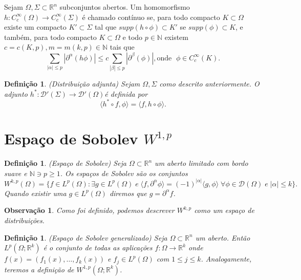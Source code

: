 \documentclass[12pt]{book}
\newtheorem{definicao}[teorema]{Definição}
\newtheorem{observacao}[teorema]{Observação}
\newcommand{\distribuicoesgeral}[1]{\mathcal{D'}(#1)}
\newcommand{\espacoLp}[1]{L^{p}(#1)}
\newcommand{\espacoLpcontradominio}[2]{L^{p}(#1;#2)}
\newcommand{\espacoLpGeral}[2]{L^{#1}(#2)}
\newcommand{\espacosobolevcontradominio}[2]{W^{1,p}(#1;#2)}
\newcommand{\funcoesdiferenciaveissupp}[2]{C^{#1}_{c}(#2)}
\newcommand{\funcoesteste}{\mathcal{D}(\Omega)}
\newcommand{\produtointerno}[2]{\langle #1, #2 \rangle}
\newcommand{\real}[1]{\mathbb{R}^{#1}}
\begin{document}
	Sejam $\Omega, \Sigma \subset \real{n}$ subconjuntos abertos. Um homomorfismo $h : \funcoesdiferenciaveissupp{\infty}{\Omega} \to \funcoesdiferenciaveissupp{\infty}{\Sigma}$ é chamado contínuo se, para todo compacto $K \subset \Omega$ existe um compacto $K' \subset \Sigma$ tal que $supp(h \circ \phi ) \subset K'$ se $supp(\phi) \subset K$, e também, para todo compacto $K \subset \Omega$ e todo $p \in \mathbb{N}$ existem $c = c(K,p), m = m(k,p) \in \mathbb{N}$ tais que 
	$$
	\sum_{|\alpha|\leq p}|\partial^{\alpha}(h\phi)|\leq c			\sum_{|\beta|\leq p}|\partial^{\beta}(\phi)|, \text{onde }\; \phi \in \funcoesdiferenciaveissupp{\infty}{K}.
	$$
	
	\begin{definicao}\label{definicao_distribuicao_adjunta}
		(Distribuição adjunta) Sejam $\Omega, \Sigma$ como descrito anteriormente. O adjunto $h^{*}: \distribuicoesgeral{\Sigma} \to \distribuicoesgeral{\Omega}$é definida por
		$$
		\produtointerno{h^{*}\circ f}{\phi} = 		\produtointerno{f}{h\circ\phi}.
		$$
	\end{definicao}\label{definicao_espalo_sobolev}
	\section{Espaço de Sobolev $W^{1,p}$}\label{secao_espaco_sobolev}
	\begin{definicao}
		(Espaço de Sobolev) Seja $\Omega \subset \real{n}$ um aberto limitado com bordo suave e $\mathbb{N} \ni p\geq 1$. Os espaços de Sobolev são os conjuntos
		$$
		W^{k,p} (\Omega)= \{ f\in \espacoLp{\Omega}: \exists g \in \espacoLp{\Omega} \; e \;\produtointerno{f}{\partial^{\alpha}\phi} = (-1)^{|\alpha|}\produtointerno{g}{\phi}\; \forall \phi \in \funcoesteste \; e\; |\alpha|\leq k\}.
		$$
		Quando existir uma $g \in \espacoLpGeral{p}{\Omega}$ diremos que $g = \partial^{\alpha}f$.
	\end{definicao}
	
	\begin{observacao}\label{observacao_espacos_sobolev_distribuicao}
		Como foi definido, podemos descrever $W^{k,p}$ como um espaço de distribuições.
	\end{observacao}
	
	\begin{definicao}\label{definicao_espalo_sobolev_generalizado}
		(Espaço de Sobolev generalizado) Seja $\Omega\subset \real{n}$ um aberto. Então 
		$\espacoLpcontradominio{\Omega}{\real{k}}$ é o conjunto de todas as aplicações $f:\Omega \to \real{k}$ onde $f(x) = (f_{1}(x), \dots, f_{k}(x))$ e $f_{j}\in \espacoLp{\Omega}$ com $1\leq j\leq k$. Analogamente, teremos a definição de $\espacosobolevcontradominio{\Omega}{\real{k}}$.
	\end{definicao}
	
\end{document}

